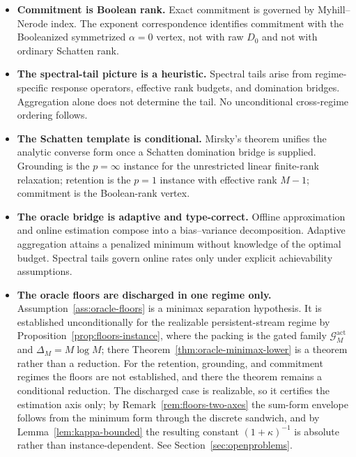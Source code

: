 \documentclass[12pt]{article}
\theoremstyle{definition}
\newcommand{\Gact}{\mathcal G^{\mathrm{act}}}
\begin{document}
\begin{itemize}[leftmargin=1.8em]
\item \textbf{Commitment is Boolean rank.}
Exact commitment is governed by Myhill--Nerode index.  The exponent
correspondence identifies commitment with the Booleanized symmetrized
$\alpha=0$ vertex, not with raw $D_0$ and not with ordinary Schatten rank.

\item \textbf{The spectral-tail picture is a heuristic.}
Spectral tails arise from regime-specific response operators, effective rank
budgets, and domination bridges.  Aggregation alone does not determine the
tail.  No unconditional cross-regime ordering follows.

\item \textbf{The Schatten template is conditional.}
Mirsky's theorem unifies the analytic converse form once a Schatten
domination bridge is supplied.  Grounding is the $p=\infty$ instance for the
unrestricted linear finite-rank relaxation; retention is the $p=1$ instance
with effective rank $M-1$; commitment is the Boolean-rank vertex.

\item \textbf{The oracle bridge is adaptive and type-correct.}
Offline approximation and online estimation compose into a bias--variance
decomposition.  Adaptive aggregation attains a penalized minimum without
knowledge of the optimal budget.  Spectral tails govern online rates only
under explicit achievability assumptions.

\item \textbf{The oracle floors are discharged in one regime only.}
Assumption~\ref{ass:oracle-floors} is a minimax separation hypothesis.  It is
established unconditionally for the realizable persistent-stream regime by
Proposition~\ref{prop:floors-instance}, where the packing is the gated family
$\Gact_M$ and $\Delta_M=M\log M$; there
Theorem~\ref{thm:oracle-minimax-lower} is a theorem rather than a reduction.
For the retention, grounding, and commitment regimes the floors are not
established, and there the theorem remains a conditional reduction.  The
discharged case is realizable, so it certifies the estimation axis only; by
Remark~\ref{rem:floors-two-axes} the sum-form envelope follows from the minimum
form through the discrete sandwich, and by Lemma~\ref{lem:kappa-bounded} the
resulting constant $(1+\kappa)^{-1}$ is absolute rather than
instance-dependent.  See Section~\ref{sec:openproblems}.


\end{itemize}
\end{document}
